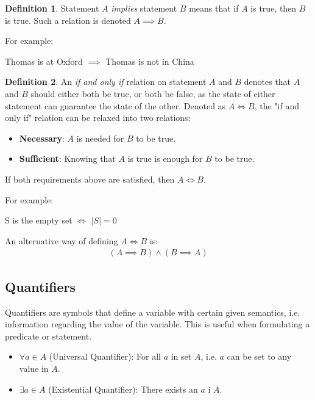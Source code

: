 \documentclass[12pt]{article}
\theoremstyle{definition}
\newtheorem{defn}{Definition}[section]
\begin{document}
 	\begin{defn}
 		Statement $A$ \emph{implies} statement $B$ means that if $A$ is true, then $B$ is true. Such a relation is denoted $A \implies B$.
  	\end{defn}
  	
  	For example:
  	\begin{center}
  		Thomas is at Oxford $\implies$ Thomas is not in China
  	\end{center}
  	
  	\begin{defn}
  		An \emph{if and only if} relation on statement $A$ and $B$ denotes that $A$ and $B$ should either both be true, or  both be false, as the state of either statement can guarantee the state of the other. Denoted as $A \iff B$, the "if and only if" relation can be relaxed into two relations:
  		\begin{itemize}
  			\item \textbf{Necessary}: $A$ is needed for $B$ to be true.
  			\item \textbf{Sufficient}: Knowing that $A$ is true is enough for $B$ to be true.
  		\end{itemize}
  		If both requirements above are satisfied, then $A \iff B$.
  	\end{defn}
  	
  	For example:
  	\begin{center}
  		S is the empty set $\iff$ $|S| = 0$
  	\end{center}
  	
  	An alternative way of defining $A \iff B$ is:
  	\begin{gather*}
  		(A \implies B) \land (B \implies A)
  	\end{gather*}
  	
  	\subsection{Quantifiers}
  	
  	Quantifiers are symbols that define a variable with certain given semantics, i.e. information regarding the value of the variable. This is useful when formulating a predicate or statement.
  	
  	\begin{itemize}
  		\item $\forall a \in A$ (Universal Quantifier): For all $a$ in set $A$, i.e. $a$ can be set to any value in $A$.
  		\item $\exists a \in A$ (Existential Quantifier): There exists an $a$ i $A$.
  	\end{itemize}
  	
\end{document}
